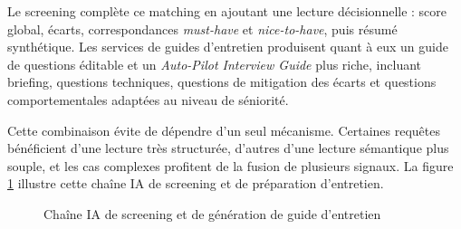Le screening complète ce matching en ajoutant une lecture décisionnelle : score global, écarts, correspondances \textit{must-have} et \textit{nice-to-have}, puis résumé synthétique. Les services de guides d'entretien produisent quant à eux un guide de questions éditable et un \textit{Auto-Pilot Interview Guide} plus riche, incluant briefing, questions techniques, questions de mitigation des écarts et questions comportementales adaptées au niveau de séniorité.

Cette combinaison évite de dépendre d'un seul mécanisme. Certaines requêtes bénéficient d'une lecture très structurée, d'autres d'une lecture sémantique plus souple, et les cas complexes profitent de la fusion de plusieurs signaux. La figure \ref{fig:ai-screening-autopilot} illustre cette chaîne IA de screening et de préparation d'entretien.

\begin{figure}[H]
  \centering
  \caption{\label{fig:ai-screening-autopilot}Chaîne IA de screening et de génération de guide d'entretien}
\end{figure}

